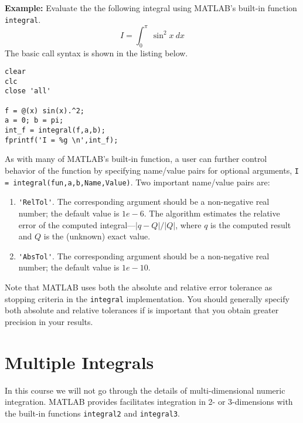 \vspace{0.2cm}

\noindent\textbf{Example:} Evaluate the the following integral using MATLAB's built-in function \lstinline[style=myMatlab]{integral}.
\begin{equation*}
I = \int_{0}^{\pi} \ \sin^{2}x \ dx
\end{equation*}
The basic call syntax is shown in the listing below.
\begin{lstlisting}[style=myMatlab,name=lec22n-ex2]
clear
clc
close 'all'

f = @(x) sin(x).^2;
a = 0; b = pi;
int_f = integral(f,a,b);
fprintf('I = %g \n',int_f);
\end{lstlisting}

As with many of MATLAB's built-in function, a user can further control behavior of the function by specifying name/value pairs for optional arguments, \lstinline[style=myMatlab]{I = integral(fun,a,b,Name,Value)}. Two important name/value pairs are:
\begin{enumerate}
\item \lstinline[style=myMatlab]{'RelTol'}. The corresponding argument should be a non-negative real number; the default value is $1e-6$.  The algorithm estimates the relative error of the computed integral---$|q - Q|/|Q|$, where $q$ is the computed result and $Q$ is the (unknown) exact value.  

\item \lstinline[style=myMatlab]{'AbsTol'}.  The corresponding argument should be a non-negative real number; the default value is $1e-10$.
\end{enumerate}
Note that MATLAB uses both the absolute and relative error tolerance as stopping criteria in the \lstinline[style=myMatlab]{integral} implementation.  You should generally specify both absolute and relative tolerances if is important that you obtain greater precision in your results.

\section{Multiple Integrals}
In this course we will not go through the details of multi-dimensional numeric integration.  MATLAB provides facilitates integration in 2- or 3-dimensions with the built-in functions \lstinline[style=myMatlab]{integral2} and \lstinline[style=myMatlab]{integral3}.  

